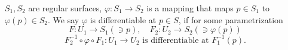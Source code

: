 \begin{definition}
    $S_1,S_2$ are regular surfaces, $\varphi\colon S_1\to
        S_2$ is a mapping that maps $p\in S_1$ to $\varphi(p)
        \in S_2$. We say $\varphi$ is differentiable at $p\in
        S$, if for some parametrization
    \[
        F\colon U_1\to S_1(\ni p),\quad F_2\colon U_2
        \to S_2(\ni \varphi(p))
    \]
    \[
        F_2^{-1}\circ \varphi \circ F_1\colon U_1\to U_2
        \text{ is differentiable at }F_1^{-1}(p).
    \]
    \begin{center}




        \begin{tikzpicture}[x=0.75pt,y=0.75pt,yscale=-1,xscale=1]


\end{tikzpicture}
\end{center}
\end{definition}
